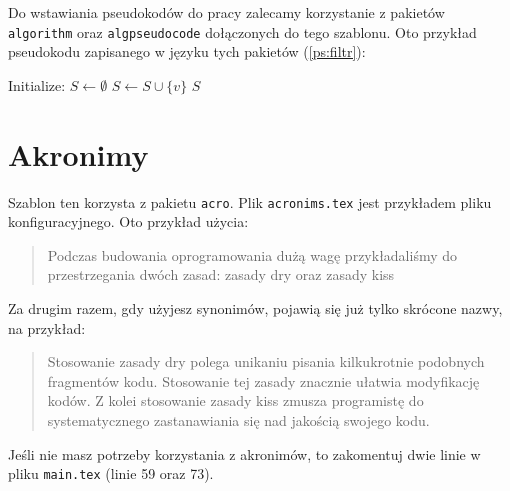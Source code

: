 Do wstawiania pseudokodów do pracy zalecamy korzystanie z pakietów \texttt{algorithm} oraz \texttt{algpseudocode} dołączonych do tego szablonu.
Oto przykład pseudokodu zapisanego w języku tych pakietów (\cref{ps:filtr}):


\begin{algorithm}[H]
\caption{Filtrowanie}
\label{ps:filtr}
\begin{algorithmic}[1]
\State Initialize: $S \gets \emptyset$
    \State $S \gets S \cup \{v\}$ 
  \EndIf
\EndFor
\State \Return $S$
\end{algorithmic}
\end{algorithm}

\section{Akronimy}

Szablon ten korzysta z pakietu \texttt{acro}. Plik \texttt{acronims.tex} jest przykładem pliku konfiguracyjnego.
Oto przykład użycia:
\begin{quote}
  Podczas budowania oprogramowania dużą wagę przykładaliśmy do przestrzegania dwóch 
	zasad: zasady \ac{dry} oraz zasady \ac{kiss} 
\end{quote}
Za drugim razem, gdy użyjesz synonimów, pojawią się już tylko skrócone nazwy, na przykład:
\begin{quote}
  Stosowanie zasady \ac{dry} polega unikaniu pisania kilkukrotnie podobnych fragmentów kodu.  Stosowanie tej zasady znacznie ułatwia modyfikację kodów. 
  Z kolei stosowanie zasady \ac{kiss} zmusza programistę do systematycznego zastanawiania się nad jakością swojego kodu.
\end{quote}

Jeśli nie masz potrzeby korzystania z akronimów, to zakomentuj dwie linie w pliku \texttt{main.tex} (linie 59 oraz 73).
 
